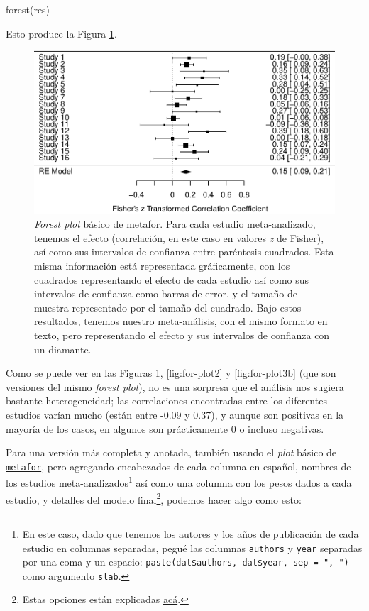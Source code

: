 \documentclass[
  bookmarksnumbered]{article}
\newenvironment{Shaded}{\begin{snugshade}}{\end{snugshade}}
\newcommand{\FunctionTok}[1]{\textcolor[rgb]{0.39,0.29,0.61}{#1}}
\newcommand{\NormalTok}[1]{\textcolor[rgb]{0.12,0.11,0.11}{#1}}
\begin{document}
\begin{Shaded}
\begin{Highlighting}[]
\FunctionTok{forest}\NormalTok{(res)}
\end{Highlighting}
\end{Shaded}

Esto produce la Figura \ref{fig:for-plot1}.

\begin{figure}
\centering
\includegraphics{Meta-analysis_files/figure-latex/for-plot1-1.pdf}
\caption{\label{fig:for-plot1}\emph{Forest plot} básico de \href{https://www.metafor-project.org/doku.php}{metafor}. Para cada estudio meta-analizado, tenemos el efecto (correlación, en este caso en valores \emph{z} de Fisher), así como sus intervalos de confianza entre paréntesis cuadrados. Esta misma información está representada gráficamente, con los cuadrados representando el efecto de cada estudio así como sus intervalos de confianza como barras de error, y el tamaño de muestra representado por el tamaño del cuadrado. Bajo estos resultados, tenemos nuestro meta-análisis, con el mismo formato en texto, pero representando el efecto y sus intervalos de confianza con un diamante.}
\end{figure}

Como se puede ver en las Figuras \ref{fig:for-plot1}, \ref{fig:for-plot2} y \ref{fig:for-plot3b} (que son versiones del mismo \emph{forest plot}), no es una sorpresa que el análisis nos sugiera bastante heterogeneidad; las correlaciones encontradas entre los diferentes estudios varían mucho (están entre -0.09 y 0.37), y aunque son positivas en la mayoría de los casos, en algunos son prácticamente 0 o incluso negativas.

Para una versión más completa y anotada, también usando el \emph{plot} básico de \href{https://www.metafor-project.org/doku.php}{\texttt{metafor}}, pero agregando encabezados de cada columna en español, nombres de los estudios meta-analizados\footnote{En este caso, dado que tenemos los autores y los años de publicación de cada estudio en columnas separadas, pegué las columnas \texttt{authors} y \texttt{year} separadas por una coma y un espacio: \texttt{paste(dat\$authors,\ dat\$year,\ sep\ =\ ",\ ")} como argumento \texttt{slab}.} así como una columna con los pesos dados a cada estudio, y detalles del modelo final\footnote{Estas opciones están explicadas \href{https://search.r-project.org/CRAN/refmans/metafor/html/forest.rma.html}{acá}.}, podemos hacer algo como esto:
\end{document}
